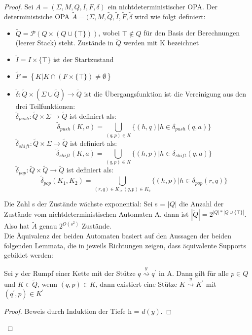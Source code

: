 \begin{proof}
Sei $A=(\Sigma, M, Q, I, F, \delta)$ ein nichtdeterministischer OPA. Der deterministsiche OPA $\tilde{A}=(\Sigma, M, \tilde{Q}, \tilde{I}, \tilde{F}, \tilde{\delta}$ wird wie folgt definiert:
\begin{itemize}
\item
$\tilde{Q} = \mathcal{P}(Q \times (Q \cup \{\top\}))$, wobei $\top \notin Q$ für den Basis der Berechnungen (leerer Stack) steht. Zustände in $\tilde{Q}$ werden mit K bezeichnet
\item
$\tilde{I}=I\times \{\top \}$ ist der Startzustand
\item
$\tilde{F}=\left\{K|K \cap (F \times \{\top\}) \neq \emptyset\right\}$
\item
$\tilde{\delta}: \tilde{Q} \times (\Sigma \cup \tilde{Q})\rightarrow \tilde{Q}$ ist die Übergangsfunktion ist die Vereinigung aus den drei Teilfunktionen:\\[2ex]
$\tilde{\delta}_{push}: \tilde{Q} \times \Sigma \rightarrow \tilde{Q}$ ist definiert als: 
\begin{equation*}
\tilde{\delta}_{push}(K, a) = \bigcup\limits_{(q,p) \in K} \{(h,q)|h \in \delta_{push}(q,a)\}
\end{equation*}
$\tilde{\delta}_{shift}: \tilde{Q} \times \Sigma \rightarrow \tilde{Q}$ ist definiert als: 
\begin{equation*}
\tilde{\delta}_{shift}(K, a) = \bigcup\limits_{(q,p) \in K} \{(h,p)|h \in \delta_{shift}(q,a)\}
\end{equation*}
$\tilde{\delta}_{pop}: \tilde{Q} \times \tilde{Q}\rightarrow \tilde{Q}$ ist definiert als: 
\begin{equation*}
\tilde{\delta}_{pop}(K_1, K_2) = \bigcup\limits_{(r,q) \in K_1, (q,p)\in K_2} \{(h,p)|h \in \delta_{pop}(r,q)\}
\end{equation*}
\end{itemize}
Die Zahl s der Zustände wächste exponential: Sei s = $|Q|$ die Anzahl der Zustände vom nichtdeterministischen Automaten A, dann ist $|\tilde{Q}| = 2^{|Q| * |Q \cup \{\top\}|}$. Also hat $\tilde{A}$ genau $2^{O(s^2)}$ Zustände.\\
Die Äquivalenz der beiden Automaten basiert auf den Aussagen der beiden folgenden Lemmata, die in jeweils Richtungen zeigen, dass äquivalente Supports gebildet werden:
\begin{lemma}
Sei y der Rumpf einer Kette mit der Stütze $q\stackrel{y}{\rightsquigarrow} q^\prime$ in A. Dann gilt für alle $p \in Q$ und $K \in \tilde{Q}$, wenn $(q,p) \in K$, dann existiert eine Stütze $K\stackrel{y}{\rightsquigarrow} K^\prime$ mit $(q^\prime, p) \in K^\prime $
\end{lemma}
\begin{proof}
\label{lemma_deter1}
Beweis durch Induktion der Tiefe h = $d(y)$. 

\end{proof}
\end{proof}

